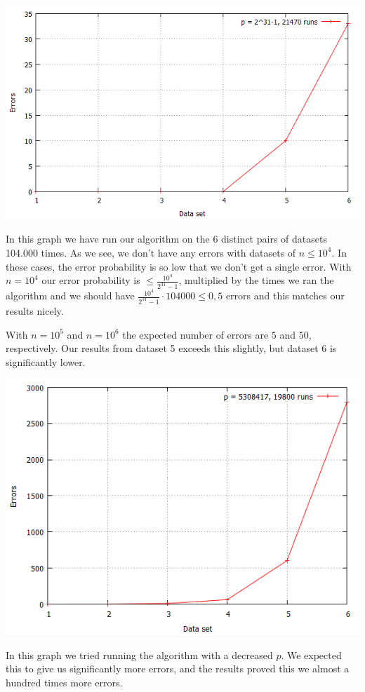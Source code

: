 \documentclass[article,a4paper,oneside]{article}
\newcommand{\+}[1]{\ensuremath{\boldsymbol{#1}}}
\begin{document}
\begin{center}
\includegraphics[scale=0.5]{p=2^31-1.png}\\
\end{center}
In this graph we have run our algorithm on the 6 distinct pairs of datasets 104.000 times. As we see, we don't have any errors with datasets of $n\leq 10^4$. In these cases, the error probability is so low that we don't get a single error. With $n=10^4$ our error probability is $\leq \frac{10^4}{2^{31}-1}$, multiplied by the times we ran the algorithm and we should have $\frac{10^4}{2^{31}-1}\cdot 104000 \leq 0,5$ errors and this matches our results nicely.

With $n=10^5$ and $n=10^6$ the expected number of errors are $5$ and $50$, respectively. Our results from dataset 5 exceeds this slightly, but dataset 6 is significantly lower.

\begin{center}
\includegraphics[scale=0.5]{p=5308417.png}\\
\end{center}
In this graph we tried running the algorithm with a decreased $p$. We expected this to give us significantly more errors, and the results proved this we almost a hundred times more errors.
\end{document}
